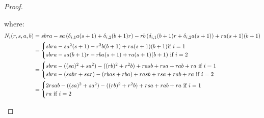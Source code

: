 \begin{proof}
\begin{enumerate}
$$                        $$
                    where:
                        $$
                            \begin{aligned}
                                N_i(r, s, a, b) & = 
                                sbra
                                - sa \left( \delta_{i, 1} a(s + 1) + \delta_{i, 2} (b + 1) r \right) 
                                - rb \left( \delta_{i, 1} (b + 1) r + \delta_{i, 2} a (s + 1) \right)
                                + r a (s + 1) (b + 1)
                                \\
                                & = 
                                \begin{cases}
                                    \text{$
                                        sbra
                                        - s a^2 (s + 1) 
                                        - r^2 b (b + 1)
                                        + r a (s + 1) (b + 1)
                                    $if $i = 1$}
                                    \\
                                    \text{$
                                        sbra
                                        - sa (b + 1) r
                                        - rb a (s + 1)
                                        + r a (s + 1) (b + 1)
                                    $ if $i = 2$}
                                \end{cases}
                                \\
                                & = 
                                \begin{cases}
                                    \text{$
                                        sbra
                                        - ( (sa)^2 + s a^2 ) 
                                        - ( (rb)^2 + r^2 b ) 
                                        + rasb + rsa + rab + ra
                                    $ if $i = 1$}
                                    \\
                                    \text{$
                                        sbra
                                        - (sabr + sar)
                                        - (rbas + rba)
                                        + rasb + rsa + rab + ra
                                    $ if $i = 2$}
                                \end{cases}
                                \\
                                & = 
                                \begin{cases}
                                    \text{$2 rsab - ( (sa)^2 + s a^2 ) - ( (rb)^2 + r^2 b ) + rsa + rab + ra$ if $i = 1$}
                                    \\
                                    \text{$ra$ if $i = 2$}
                                \end{cases}
                            \end{aligned}
                        $$
                    

\end{enumerate}
\end{proof}
